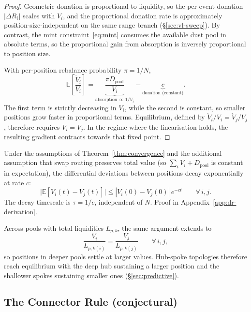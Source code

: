\documentclass{manuscript}
\begin{document}
\begin{proof}
Geometric donation is proportional to liquidity, so the per-event donation $|\Delta R_i|$ scales with $V_i$, and the proportional donation rate is approximately position-size-independent on the same range branch (\S\ref{sec:vl-sweep}). By contrast, the mint constraint~\eqref{eq:mint} consumes the available dust pool in absolute terms, so the proportional gain from absorption is inversely proportional to position size.

With per-position rebalance probability $\pi = 1/N$,
\begin{equation}\label{eq:growth}
\mathbb{E}\!\left[\frac{\dot{V}_i}{V_i}\right]
=
\underbrace{\frac{\pi D_{\text{pool}}}{V_i}}_{\text{absorption}\,\propto\,1/V_i}
-
\underbrace{c}_{\text{donation (constant)}}.
\end{equation}
The first term is strictly decreasing in $V_i$, while the second is constant, so smaller positions grow faster in proportional terms. Equilibrium, defined by $\dot{V}_i/V_i = \dot{V}_j/V_j$, therefore requires $V_i = V_j$. In the regime where the linearisation holds, the resulting gradient contracts towards that fixed point.
\end{proof}

\begin{corollary}\label{cor:convergence-rate}
Under the assumptions of Theorem~\ref{thm:convergence} and the additional assumption that swap routing preserves total value (so $\sum_i V_i + D_{\text{pool}}$ is constant in expectation), the differential deviations between positions decay exponentially at rate $c$:
\[
\bigl|\mathbb{E}[V_i(t) - V_j(t)]\bigr|
\leq
|V_i(0) - V_j(0)|\,e^{-ct}
\qquad \forall\, i,j.
\]
The decay timescale is $\tau = 1/c$, independent of $N$. Proof in Appendix~\ref{app:dr-derivation}.
\end{corollary}

\noindent Across pools with total liquidities $L_{p,k}$, the same argument extends to
\begin{equation}\label{eq:multipool}
\frac{V_i}{L_{p,k(i)}}
=
\frac{V_j}{L_{p,k(j)}}
\qquad \forall\, i,j,
\end{equation}
so positions in deeper pools settle at larger values. Hub-spoke topologies therefore reach equilibrium with the deep hub sustaining a larger position and the shallower spokes sustaining smaller ones (\S\ref{sec:predictive}).

\subsection{The Connector Rule (conjectural)}\label{sec:connector}
\end{document}
